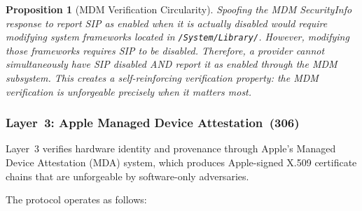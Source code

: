 \documentclass[11pt,letterpaper]{article}
\newtheorem{proposition}{Proposition}
\begin{document}
\begin{proposition}[MDM Verification Circularity]
Spoofing the MDM SecurityInfo response to report SIP as enabled when it is actually disabled would require modifying system frameworks located in \texttt{/System/Library/}. However, modifying those frameworks requires SIP to be disabled. Therefore, a provider cannot simultaneously have SIP disabled AND report it as enabled through the MDM subsystem. This creates a self-reinforcing verification property: the MDM verification is unforgeable precisely when it matters most.
\end{proposition}

\subsubsection{Layer~3: Apple Managed Device Attestation~(306)}

Layer~3 verifies hardware identity and provenance through Apple's Managed Device Attestation (MDA) system, which produces Apple-signed X.509 certificate chains that are unforgeable by software-only adversaries.

The protocol operates as follows:
\end{document}
